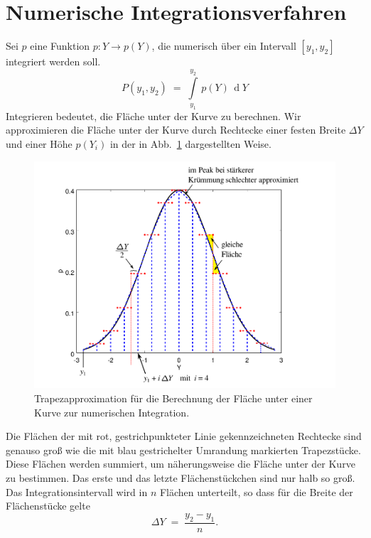 
\section{Numerische Integrationsverfahren}
Sei $p$ eine Funktion $p \! : Y \rightarrow p(Y)$, die numerisch über ein
Intervall $[y_1, y_2]$ integriert werden soll.
\begin{equation}
P(y_1, y_2) \; = \; \int\limits_{y_1}^{y_2} \, p(Y) \, \operatorname{d}Y
\end{equation}
Integrieren bedeutet, die Fläche unter der Kurve zu berechnen. Wir approximieren die
Fläche unter der Kurve durch Rechtecke einer festen Breite $\Delta Y$ und einer Höhe
$p(Y_i)$ in der in Abb.~\ref{Trapez} dargestellten Weise.
\begin{figure}
\begin{center}
\includegraphics[width=130mm]{09_vorlesung/media/numerischeIntTrapez.pdf}
\caption{\label{Trapez} Trapezapproximation für die Berechnung der Fläche unter einer
Kurve zur numerischen Integration.}
\end{center}
\end{figure}
Die Flächen der mit rot, gestrichpunkteter Linie gekennzeichneten Rechtecke sind genauso
groß wie die mit blau gestrichelter Umrandung markierten Trapezstücke. Diese Flächen
werden summiert, um näherungsweise die Fläche unter der Kurve zu bestimmen.
Das erste und das letzte Flächenstückchen sind nur halb so groß.
Das Integrationsintervall wird in $n$ Flächen unterteilt, so dass für die Breite
der Flächenstücke gelte
\begin{equation}
\Delta Y \; = \; \frac{y_2 - y_1}{n} .
\end{equation}
